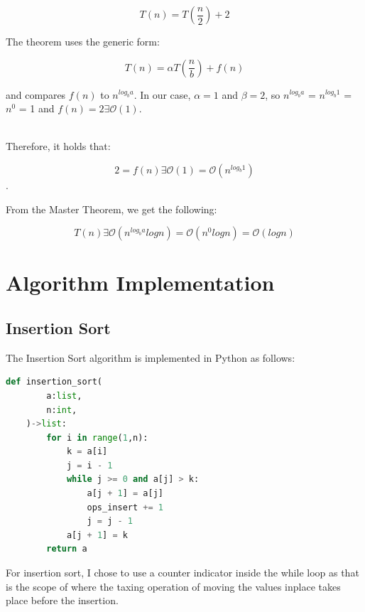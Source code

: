 \documentclass{article}
\begin{document}
$$T(n) = T(\frac{n}{2}) + 2$$

The theorem uses the generic form:

$$T(n) = \alpha T(\frac{n}{b}) + f(n)$$

and compares $f(n)$ to $n^{log_b a}$. In our case, $\alpha = 1$ and $\beta = 2$, so $n^{log_b a}$ = $n^{log_b 1}$ = $n^0$ = 1 and $f(n) = 2\exists \mathcal{O}(1)$.

\\

Therefore, it holds that:

$$2 = f(n)\exists \mathcal{O}(1) = \mathcal{O}(n^{log_b 1})$$.

From the Master Theorem, we get the following:

$$T(n) \exists \mathcal{O}(n^{log_b a} log n) = \mathcal{O}(n^0 log n) = \mathcal{O}(log n)$$

\section{Algorithm Implementation}
\subsection{Insertion Sort}
The Insertion Sort algorithm is implemented in Python as follows:
\begin{lstlisting}[language=Python]
    def insertion_sort(
        a:list,
        n:int,
    )->list:
        for i in range(1,n):
            k = a[i]
            j = i - 1
            while j >= 0 and a[j] > k:
                a[j + 1] = a[j]
                ops_insert += 1
                j = j - 1
            a[j + 1] = k
        return a
\end{lstlisting}

For insertion sort, I chose to use a counter indicator inside the while loop as that is the scope of where the taxing operation of moving the values inplace takes place before the insertion.
\end{document}
